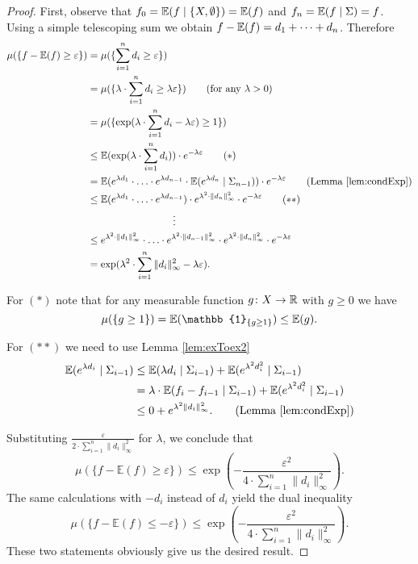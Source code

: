 \begin{proof} First, observe that $f_0=\mathbb{E}(f\mid \{X,\emptyset\})=\mathbb{E}(f)$ and $f_n=\mathbb{E}(f\mid\Sigma)=f$. Using a simple telescoping sum we obtain $f-\mathbb{E}(f)=d_1+\dots+d_n$. Therefore
\begin{align*}
\mu(\{f-\E(f)\geq \varepsilon\})&=\mu(\{\sum_{i=1}^{n}d_i\geq  \varepsilon\})\\
&=\mu(\{\lambda\cdot\sum_{i=1}^{n}d_i\geq \lambda \varepsilon\})\tag{for any $\lambda>0$}\\
&=\mu(\{\exp({\lambda\cdot\sum_{i=1}^{n}d_i-\lambda \varepsilon})\geq 1\})\\
&\leq\E(\exp({\lambda\cdot\sum_{i=1}^{n}d_i}))\cdot e^{-\lambda \varepsilon}\tag{$\ast$}\\
&=\E(e^{\lambda d_1}\cdot\ldots\cdot e^{\lambda d_{n-1}}\cdot\E(e^{\lambda d_n}\mid \Sigma_{n-1}))\cdot e^{-\lambda \varepsilon}\tag{Lemma \ref{lem:condExp}}\\
&\leq\E(e^{\lambda d_1}\cdot\ldots\cdot e^{\lambda d_{n-1}})\cdot e^{\lambda^2\cdot \|d_n\|^2_\infty}\cdot e^{-\lambda \varepsilon}\tag{$\ast\ast$}\\
&\hspace{3cm}\vdots\\
&\leq e^{\lambda^2\cdot \|d_1\|^2_\infty}\cdot\ldots\cdot e^{\lambda^2\cdot \|d_{n-1}\|^2_\infty}\cdot e^{\lambda^2\cdot \|d_n\|^2_\infty}\cdot e^{-\lambda \varepsilon}\\
&=\exp({\lambda^2\cdot\sum_{i=1}^n\|d_i\|^2_\infty-\lambda \varepsilon}).
\end{align*}

For $(\ast)$ note that for any measurable function $g\colon X\to\mathbb{R}$ with $g\geq0$ we have %
\[\mu(\{g\geq1\})=\E(\mathbb{1}_{\{g\geq1\}})\leq\E(g).\]

For $(\ast\ast)$ we need to use Lemma \ref{lem:exToex2}
\begin{align*}
\E(e^{\lambda d_i}\mid \Sigma_{i-1})&\leq \E(\lambda d_i\mid\Sigma_{i-1})+\E(e^{\lambda^2 d^2_i}\mid\Sigma_{i-1})\\
&=\lambda\cdot\E( f_i-f_{i-1}\mid\Sigma_{i-1}) + \E(e^{\lambda^2 d^2_i}\mid\Sigma_{i-1})\\
&\leq 0 + e^{\lambda^2 \|d_i\|_\infty^2}.\tag{Lemma \ref{lem:condExp}}
\end{align*}

Substituting $\frac{\varepsilon}{2\cdot\sum_{i=1}^{n}\|d_i\|_\infty^2}$ for $\lambda$, we conclude that
\[\mu(\{f-\mathbb{E}(f)\geq \varepsilon\})\leq\exp\left(-\frac{\varepsilon^2}{4\cdot\sum_{i=1}^{n}\|d_i\|^2_\infty}\right). \]
The same calculations with $-d_i$ instead of $d_i$ yield the dual inequality
\[\mu(\{f-\mathbb{E}(f)\leq -\varepsilon\})\leq\exp\left(-\frac{\varepsilon^2}{4\cdot\sum_{i=1}^{n}\|d_i\|^2_\infty}\right). \]
These two statements obviously give us the desired result.
\end{proof}

